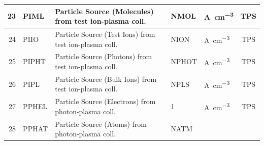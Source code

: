 \begin{landscape}
\begin{longtable}{|r|l|l|l|l|c|}
    23                                                             & PIML
                                                                   & Particle Source
    (Molecules) from test ion-plasma coll.
                                                                   & NMOL
                                                                   &
    \si{\ampere\per\cubic\centi\metre}                             & TPS
    \\  \hline
    24                                                             & PIIO
                                                                   & Particle Source (Test
    Ions) from test ion-plasma coll.
                                                                   & NION
                                                                   &
    \si{\ampere\per\cubic\centi\metre}                             & TPS
    \\	\hline
    25                                                             & PIPHT
                                                                   & Particle Source (Photons)
    from test ion-plasma coll.
                                                                   & NPHOT
                                                                   &
    \si{\ampere\per\cubic\centi\metre}                             & TPS
    \\	\hline
    26                                                             & PIPL
                                                                   & Particle Source (Bulk
    Ions) from test ion-plasma coll.
                                                                   & NPLS
                                                                   &
    \si{\ampere\per\cubic\centi\metre}                             & TPS
    \\	\hline
    27                                                             & PPHEL
                                                                   & Particle Source
    (Electrons) from photon-plasma coll.
                                                                   & 1
                                                                   &
    \si{\ampere\per\cubic\centi\metre}                             & TPS
    \\	\hline
    28                                                             & PPHAT
                                                                   & Particle Source (Atoms)
    from photon-plasma coll.
                                                                   & NATM

\end{longtable}
\end{landscape}
